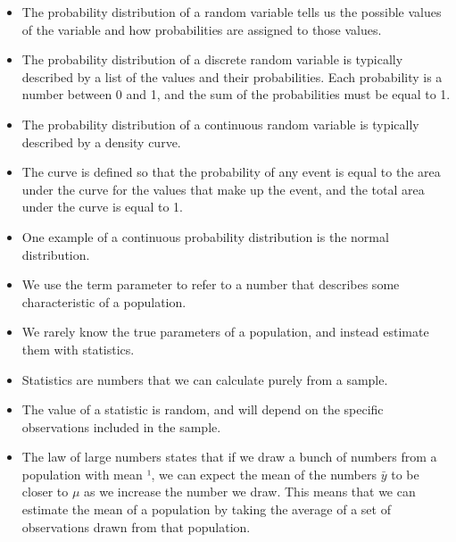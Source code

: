 \documentclass[a4paper,12pt]{article}
\begin{document}
\begin{itemize}
\item The probability distribution of a random variable tells us the possible values of the variable and how
probabilities are assigned to those values.
\item The probability distribution of a discrete random variable is typically described by a list of the
values and their probabilities. Each probability is a number between 0 and 1, and the sum of the
probabilities must be equal to 1.

\item The probability distribution of a continuous random variable is typically described by a density
curve. \item The curve is defined so that the probability of any event is equal to the area under the
curve for the values that make up the event, and the total area under the curve is equal to 1. \item One
example of a continuous probability distribution is the normal distribution.

\item We use the term parameter to refer to a number that describes some characteristic of a population. \item  We
rarely know the true parameters of a population, and instead estimate them with statistics. \item Statistics
are numbers that we can calculate purely from a sample. \item The value of a statistic is random, and will
depend on the specific observations included in the sample.

\item The law of large numbers states that if we draw a bunch of numbers from a population with mean ¹,
we can expect the mean of the numbers $\bar{y}$ to be closer to $\mu$ as we increase the number we draw. This
means that we can estimate the mean of a population by taking the average of a set of observations
drawn from that population.
\end{itemize}

\end{document}
